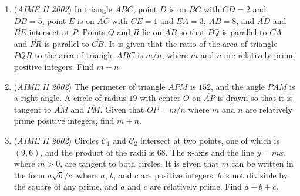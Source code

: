 \begin{enumerate}
 

	\item (\textit{AIME II 2002}) In triangle $ABC$, point $D$ is on $\overline{BC}$ with $CD=2$ and $DB=5$, point $E$ is on $\overline{AC}$ with $CE=1$ and $EA=3$, $AB=8$, and $\overline{AD}$ and $\overline{BE}$ intersect at $P$. Points $Q$ and $R$ lie on $\overline{AB}$ so that $\overline{PQ}$ is parallel to $\overline{CA}$ and $\overline{PR}$ is parallel to $\overline{CB}$. It is given that the ratio of the area of triangle $PQR$ to the area of triangle $ABC$ is $m/n$, where $m$ and $n$ are relatively prime positive integers. Find $m+n$.


 

	\item (\textit{AIME II 2002}) The perimeter of triangle $APM$ is $152$, and the angle $PAM$ is a right angle. A circle of radius $19$ with center $O$ on $\overline{AP}$ is drawn so that it is tangent to $\overline{AM}$ and $\overline{PM}$. Given that $OP=m/n$ where $m$ and $n$ are relatively prime positive integers, find $m+n$.


 

	\item (\textit{AIME II 2002}) Circles $\mathcal{C}_{1}$ and $\mathcal{C}_{2}$ intersect at two points, one of which is $(9,6)$, and the product of the radii is $68$. The x-axis and the line $y = mx$, where $m > 0$, are tangent to both circles. It is given that $m$ can be written in the form $a\sqrt {b}/c$, where $a$, $b$, and $c$ are positive integers, $b$ is not divisible by the square of any prime, and $a$ and $c$ are relatively prime. Find $a + b + c$.


 

\end{enumerate}